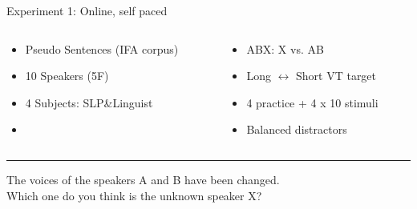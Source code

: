 \documentclass[xcolor={dvipsnames}]{beamer}
\begin{document}
\begin{frame}{Experiment 1: Online, self paced}
\begin{columns}
\begin{column}{0.48\textwidth}
\begin{itemize}
    \item Pseudo Sentences (IFA corpus)
    \item 10 Speakers (5F)
    \item 4 Subjects: SLP\&Linguist
    \item[ ] \ 
\end{itemize}
\end{column}
\begin{column}{0.48\textwidth}
\begin{itemize}
    \item ABX: X vs. AB
    \item[ ] Long $\leftrightarrow$ Short VT target
    \item 4 practice + 4 x 10 stimuli
    \item Balanced distractors
\end{itemize}
\end{column}
\end{columns}
\vskip 1cm
\hrule
\vskip 0.5cm
The voices of the speakers A and B have been changed. \\
Which one do you think is the unknown speaker X?
\vskip 0.5cm


\end{frame}
\end{document}
